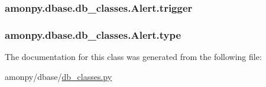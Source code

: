 \hypertarget{classamonpy_1_1dbase_1_1db__classes_1_1_alert_ae7cb911f5a8c43290bc5f7263abbcfb0}{
\subsubsection[{trigger}]{\setlength{\rightskip}{0pt plus 5cm}amonpy.\-dbase.\-db\-\_\-classes.\-Alert.\-trigger}}\label{classamonpy_1_1dbase_1_1db__classes_1_1_alert_ae7cb911f5a8c43290bc5f7263abbcfb0}
\hypertarget{classamonpy_1_1dbase_1_1db__classes_1_1_alert_aab97b4bd290097eba5b8df6ca82a484d}{
\subsubsection[{type}]{\setlength{\rightskip}{0pt plus 5cm}amonpy.\-dbase.\-db\-\_\-classes.\-Alert.\-type}}\label{classamonpy_1_1dbase_1_1db__classes_1_1_alert_aab97b4bd290097eba5b8df6ca82a484d}


The documentation for this class was generated from the following file\-:\begin{DoxyCompactItemize}
\item 
amonpy/dbase/\hyperlink{db__classes_8py}{db\-\_\-classes.\-py}\end{DoxyCompactItemize}
